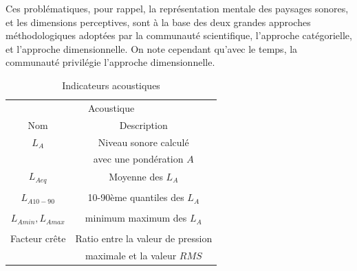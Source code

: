 {\begin{itemize}
\end{itemize}

Ces problématiques, pour rappel, la représentation mentale des paysages sonores, et les dimensions perceptives, sont à la base des deux grandes approches méthodologiques adoptées par la communauté scientifique, l'approche catégorielle, et l'approche dimensionnelle. On note cependant qu'avec le temps, la communauté privilégie l'approche dimensionnelle. \\


\begin{table}[t]
\centering
\begin{tabular}{c c} 
\multicolumn{2}{c}{Acoustique} \\ 
Nom                           & Description            \\                                                            
\hline
$L_{A}$                                   & Niveau sonore calculé      \\
                                          & avec une pondération $A$\\
$L_{Aeq}$                                 & Moyenne des $L_A$     \\
                                          &         \\
$L_{A10-90}$                              & 10-90ème quantiles des $L_A$     \\
                                          &         \\
$L_{Amin}, L_{Amax}$                      & minimum maximum des $L_A$    \\
                                          &         \\
Facteur crête                             & Ratio entre la valeur de pression     \\
                                          & maximale et la valeur $RMS$        \\                                          
\hline
\end{tabular}
\vspace{0.5mm}
\caption{ Indicateurs acoustiques}
\label{tab:acousIndi}
\end{table}

}
